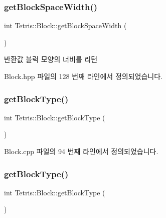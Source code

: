 \subsubsection{\texorpdfstring{get\+Block\+Space\+Width()}{getBlockSpaceWidth()}\hspace{0.1cm}{\footnotesize\ttfamily [2/2]}}
{\footnotesize\ttfamily int Tetris\+::\+Block\+::get\+Block\+Space\+Width (\begin{DoxyParamCaption}{ }\end{DoxyParamCaption})\hspace{0.3cm}{\ttfamily [inline]}}

\begin{DoxyReturn}{반환값}
블럭 모양의 너비를 리턴 
\end{DoxyReturn}


Block.\+hpp 파일의 128 번째 라인에서 정의되었습니다.

\mbox{\label{class_tetris_1_1_block_a8780b7c5d836c3bb6bae3de5cdcba5e1}} 
\subsubsection{\texorpdfstring{get\+Block\+Type()}{getBlockType()}\hspace{0.1cm}{\footnotesize\ttfamily [1/2]}}
{\footnotesize\ttfamily int Tetris\+::\+Block\+::get\+Block\+Type (\begin{DoxyParamCaption}{ }\end{DoxyParamCaption})}



Block.\+cpp 파일의 94 번째 라인에서 정의되었습니다.

\mbox{\label{class_tetris_1_1_block_a8780b7c5d836c3bb6bae3de5cdcba5e1}} 
\subsubsection{\texorpdfstring{get\+Block\+Type()}{getBlockType()}\hspace{0.1cm}{\footnotesize\ttfamily [2/2]}}
{\footnotesize\ttfamily int Tetris\+::\+Block\+::get\+Block\+Type (\begin{DoxyParamCaption}{ }\end{DoxyParamCaption})\hspace{0.3cm}{\ttfamily [inline]}}

